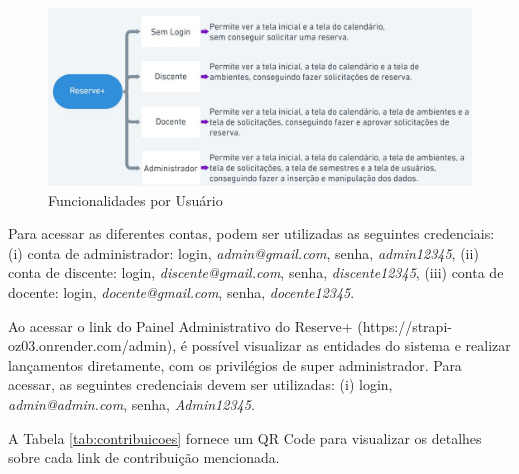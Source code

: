 \documentclass[12pt]{article}
\begin{document}
\begin{figure}[ht]
\centering
\includegraphics[width=1.0\textwidth]{funcionalidades_por_usuario.jpg}
\caption{Funcionalidades por Usuário}
\label{fig:funcionalidades}
\end{figure}

Para acessar as diferentes contas, podem ser utilizadas as seguintes credenciais: (i) conta de administrador: login, \textit{admin@gmail.com}, senha, \textit{admin12345}, (ii) conta de discente: login, \textit{discente@gmail.com}, senha, \textit{discente12345}, (iii) conta de docente: login, \textit{docente@gmail.com}, senha, \textit{docente12345}. 

Ao acessar o link do Painel Administrativo do Reserve+ (https://strapi-oz03.onrender.com/admin), é possível visualizar as entidades do sistema e realizar lançamentos diretamente, com os privilégios de super administrador. Para acessar, as seguintes credenciais devem ser utilizadas: (i) login, \textit{admin@admin.com}, senha, \textit{Admin12345}.

A Tabela \ref{tab:contribuicoes} fornece um QR Code para visualizar os detalhes sobre cada link de contribuição mencionada. 
\end{document}
